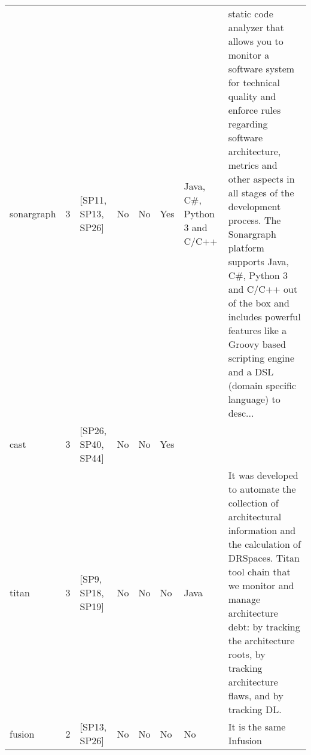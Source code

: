 \begin{tabular}{lrllllll}
          sonargraph &      3 &                                     [SP11, SP13, SP26] &    No &       No &       Yes &                                                                                                                                                            Java, C\#, Python 3 and C/C++ &  static code analyzer that allows you to monitor a software system for technical quality and enforce rules regarding software architecture, metrics and other aspects in all stages of the development process. The Sonargraph platform supports Java, C\#, Python 3 and C/C++ out of the box and includes powerful features like a Groovy based scripting engine and a DSL (domain specific language) to desc... \\
                cast &      3 &                                     [SP26, SP40, SP44] &    No &       No &       Yes &                                                                                                                                                                                         &                                                                                                                                                                                                                                                                                                                                                                                                                  \\
               titan &      3 &                                      [SP9, SP18, SP19] &    No &       No &        No &                                                                                                                                                                                    Java &                                                                                                                                                 It was developed to automate the collection of architectural information and the calculation of DRSpaces. Titan tool chain that we monitor and manage architecture debt: by tracking the architecture roots, by tracking architecture flaws, and by tracking DL. \\
              fusion &      2 &                                           [SP13, SP26] &    No &       No &        No &                                                                                                                                                                                      No &                                                                                                                                                                                                                                                                                                                                                                                          It is the same Infusion \\

\end{tabular}
